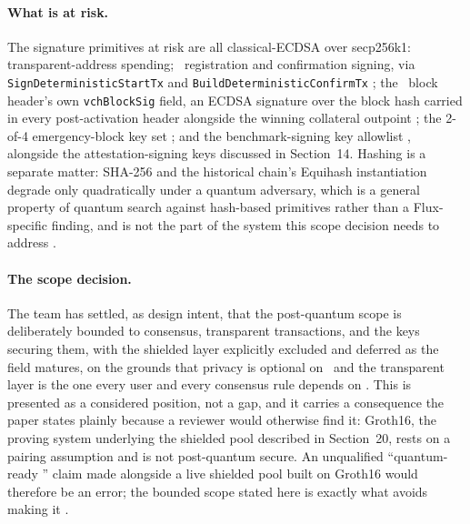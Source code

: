 \paragraph{What is at risk.} The signature primitives at risk are all classical-ECDSA over
secp256k1: transparent-address spending; \FluxNode\ registration and confirmation signing, via
\texttt{Sign\allowbreak{}Deterministic\allowbreak{}Start\allowbreak{}Tx} and \texttt{Build\allowbreak{}Deterministic\allowbreak{}Confirm\allowbreak{}Tx}
; the \PoN\ block header's own
\texttt{vchBlockSig} field, an ECDSA signature over the block hash carried in every post-activation
header alongside the winning collateral outpoint ;
the 2-of-4 emergency-block key set ; and the
benchmark-signing key allowlist , alongside the
attestation-signing keys discussed in Section~14. Hashing is a separate matter: SHA-256 and the
historical chain's Equihash instantiation degrade only quadratically under a quantum adversary, which
is a general property of quantum search against hash-based primitives rather than a Flux-specific
finding, and is not the part of the system this scope decision needs to address \srcinferred.

\paragraph{The scope decision.} The team has settled, as design intent, that the post-quantum scope is
deliberately bounded to consensus, transparent transactions, and the keys securing them, with the
shielded layer explicitly excluded and deferred as the field matures, on the grounds that privacy is
optional on \Flux\ and the transparent layer is the one every user and every consensus rule depends on
 \vision. This is presented as a considered position, not a gap, and it
carries a consequence the paper states plainly because a reviewer would otherwise find it: Groth16, the
proving system underlying the shielded pool described in Section~20, rests on a pairing assumption and
is not post-quantum secure. An unqualified ``quantum-ready \Flux'' claim made alongside a live shielded
pool built on Groth16 would therefore be an error; the bounded scope stated here is exactly what avoids
making it .

